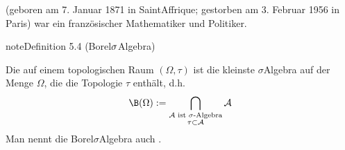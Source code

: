 \documentclass[letterpaper,10pt,english]{jupyterBook}
\begin{document}
\begin{sphinxShadowBox}
\sphinxstylesidebartitle{}

\sphinxAtStartPar
{} (geboren am 7. Januar 1871 in Saint\sphinxhyphen{}Affrique; gestorben am 3. Februar 1956 in Paris) war ein französischer Mathematiker und Politiker.
\end{sphinxShadowBox}
\label{masstheorie/masstheorie:definition-7}
\begin{sphinxadmonition}{note}{Definition 5.4 (Borel\sphinxhyphen{}\protect\(\sigma\protect\)\sphinxhyphen{}Algebra)}



\sphinxAtStartPar
Die  auf einem topologischen Raum \((\Omega, \tau)\) ist die kleinste \(\sigma\)\sphinxhyphen{}Algebra auf der Menge \(\Omega\), die die Topologie \(\tau\) enthält, d.h.
\begin{equation*}
\begin{split}\B(\Omega) := \bigcap_{\substack{\mathcal{A} \text{ ist $\sigma$-Algebra}\\ \tau \subset \mathcal{A}}} \mathcal{A}\end{split}
\end{equation*}
\sphinxAtStartPar
Man nennt die Borel\sphinxhyphen{}\(\sigma\)\sphinxhyphen{}Algebra auch .
\end{sphinxadmonition}
\end{document}

